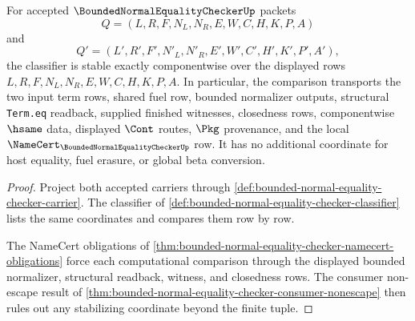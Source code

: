 \begin{theorem}
\label{thm:bounded-normal-equality-checker-classifier-stability-row}
For accepted $\BoundedNormalEqualityCheckerUp$ packets
$$
Q=(L,R,F,N_L,N_R,E,W,C,H,K,P,A)
$$
and
$$
Q'=(L',R',F',N'_L,N'_R,E',W',C',H',K',P',A'),
$$
the classifier is stable exactly componentwise over the displayed rows
$L,R,F,N_L,N_R,E,W,C,H,K,P,A$. In particular, the comparison transports
the two input term rows, shared fuel row, bounded normalizer outputs,
structural \texttt{Term.eq} readback, supplied finished witnesses,
closedness rows, componentwise $\hsame$ data, displayed $\Cont$ routes,
$\Pkg$ provenance, and the local $\NameCert_{\BoundedNormalEqualityCheckerUp}$
row. It has no additional coordinate for host equality, fuel erasure, or
global beta conversion.
\end{theorem}
\begin{proof}
Project both accepted carriers through
\autoref{def:bounded-normal-equality-checker-carrier}. The classifier of
\autoref{def:bounded-normal-equality-checker-classifier} lists the same
coordinates and compares them row by row.

The NameCert obligations of
\autoref{thm:bounded-normal-equality-checker-namecert-obligations} force
each computational comparison through the displayed bounded normalizer,
structural readback, witness, and closedness rows. The consumer non-escape
result of \autoref{thm:bounded-normal-equality-checker-consumer-nonescape}
then rules out any stabilizing coordinate beyond the finite tuple.
\end{proof}

